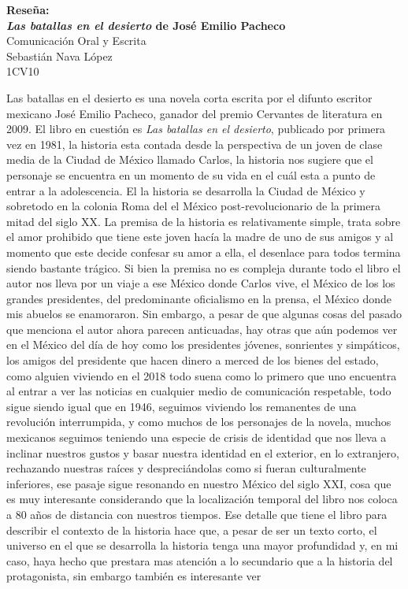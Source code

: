 \documentclass[12pt]{article}
\newcommand{\titlehomework}[4]{\begin{center}{\large \textbf{Reseña:\\{#4}}}\\[2ex]{\large #2}\\#1\\#3\\[2ex]\end{center}}
\begin{document}
\titlehomework{Sebastián Nava López}{Comunicación Oral y Escrita}{1CV10}{\textit{Las
batallas en el desierto}  de José Emilio Pacheco}
Las batallas en el desierto es una novela corta escrita por el difunto   escritor mexicano José
Emilio Pacheco, ganador del premio Cervantes de literatura en 2009. El libro en
cuestión es \textit{Las batallas en el desierto}, publicado por primera vez en 1981, la historia esta contada desde
la perspectiva de un joven de clase media de la Ciudad de  México llamado Carlos, la historia nos sugiere que el personaje se encuentra en un momento de su vida en el cuál esta a punto de entrar a la adolescencia.
El la historia se desarrolla la Ciudad de México y sobretodo en la colonia Roma del el México post-revolucionario de la primera mitad
del siglo XX. La premisa de la historia es relativamente simple, trata sobre el amor prohibido que
tiene este joven hacía la madre de uno de sus amigos y al momento que este decide confesar su amor
a ella, el desenlace para todos termina siendo bastante trágico. Si bien la premisa no es compleja
durante todo el libro el autor nos lleva por un viaje a ese México donde Carlos vive, el México
de los los grandes presidentes, del predominante oficialismo en la prensa, el México donde mis abuelos se
enamoraron. Sin embargo, a pesar de que algunas cosas del pasado que menciona el autor ahora parecen
anticuadas, hay otras que aún podemos ver en el México del día de hoy como los presidentes jóvenes,
sonrientes y simpáticos, los amigos del presidente que hacen dinero a merced de los bienes del
estado, como alguien viviendo en el 2018 todo suena como lo primero que uno encuentra al entrar a
ver las noticias en cualquier medio de comunicación respetable, todo sigue siendo igual que en
1946, seguimos viviendo los remanentes de una revolución interrumpida, y como muchos de los
personajes de la novela, muchos mexicanos seguimos teniendo una especie de crisis de identidad que nos lleva a
inclinar nuestros gustos y basar nuestra identidad en el exterior, en lo extranjero, rechazando
nuestras raíces y despreciándolas como si fueran culturalmente inferiores, ese pasaje sigue resonando en nuestro
México del siglo XXI, cosa que es muy interesante considerando que la localización temporal del
libro nos coloca a 80 años de distancia con nuestros tiempos. Ese detalle que tiene el libro para
describir el contexto de la historia hace que, a pesar de ser un texto corto, el universo en el que
se desarrolla la historia tenga una mayor profundidad y, en mi caso, haya hecho que prestara mas
atención a lo secundario que a la historia del protagonista, sin embargo también es interesante ver
\end{document}
